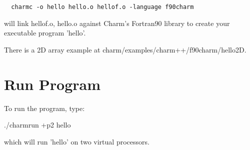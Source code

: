 \documentclass[11pt]{article}
\begin{document}
\begin{verbatim}
  charmc -o hello hello.o hellof.o -language f90charm
\end{verbatim}
    will link hellof.o, hello.o against Charm's Fortran90 library
    to create your executable program 'hello'.

  There is a 2D array example at charm/examples/charm++/f90charm/hello2D.

\section{Run Program}

To run the program, type:

./charmrun +p2 hello

which will run 'hello' on two virtual processors.
\end{document}

